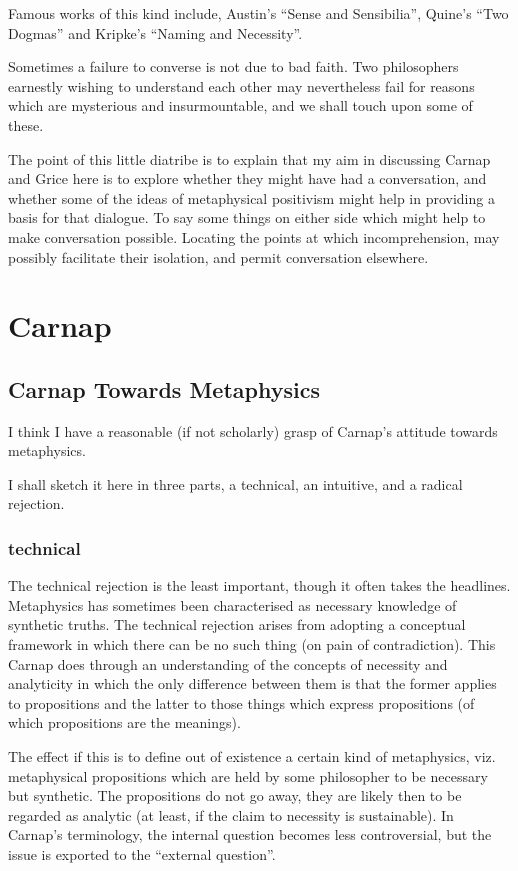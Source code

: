 \documentclass{article}
\begin{document}
Famous works of this kind include, Austin's ``Sense and Sensibilia'', Quine's ``Two Dogmas'' and Kripke's ``Naming and Necessity''.

Sometimes a failure to converse is not due to bad faith.
Two philosophers earnestly wishing to understand each other may nevertheless fail for reasons which are mysterious and insurmountable, and we shall touch upon some of these.

The point of this little diatribe is to explain that my aim in discussing Carnap and Grice here is to explore whether they might have had a conversation, and whether some of the ideas of metaphysical positivism might help in providing a basis for that dialogue.
To say some things on either side which might help to make conversation possible.
Locating the points at which incomprehension, may possibly facilitate their isolation, and permit conversation elsewhere.

\section{Carnap}

\subsection{Carnap Towards Metaphysics}

I think I have a reasonable (if not scholarly) grasp of Carnap's attitude towards metaphysics.

I shall sketch it here in three parts, a technical, an intuitive, and a radical rejection.

\subsubsection{technical}
The technical rejection is the least important, though it often takes the headlines.
Metaphysics has sometimes been characterised as necessary knowledge of synthetic truths.
The technical rejection arises from adopting a conceptual framework in which there can be no such thing (on pain of contradiction).
This Carnap does through an understanding of the concepts of necessity and analyticity in which the only difference between them is that the former applies to propositions and the latter to those things which express propositions (of which propositions are the meanings).

The effect if this is to define out of existence a certain kind of metaphysics, viz. metaphysical propositions which are held by some philosopher to be necessary but synthetic.
The propositions do not go away, they are likely then to be regarded as analytic (at least, if the claim to necessity is sustainable).
In Carnap's terminology, the internal question becomes less controversial, but the issue is exported to the ``external question''.
\end{document}
